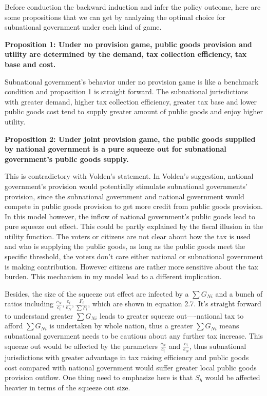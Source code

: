 \begin{itemize}
Before conduction the backward induction and infer the policy outcome, here are some propositions that we can get by analyzing the optimal choice for subnational government under each kind of game.

\textbf{Proposition 1: Under no provision game, public goods provision and utility are determined by the demand, tax collection efficiency, tax base and cost.}

Subnational government's behavior under no provision game is like a benchmark condition and proposition 1 is straight forward. The subnational jurisdictions with greater demand, higher tax collection efficiency, greater tax base and lower public goods cost tend to supply greater amount of public goods and enjoy higher utility.

\textbf{Proposition 2: Under joint provision game, the public goods supplied by national government is a pure squeeze out for subnational government's public goods supply.}

This is contradictory with Volden's statement. In Volden's suggestion, national government's provision would potentially stimulate subnational governments' provision, since the subnational government and national government would compete in public goods provision to get more credit from public goods provision. In this model however, the inflow of national government's public goods lead to pure squeeze out effect. This could be partly explained by the fiscal illusion in the utility function. The voters or citizens are not clear about how the tax is used and who is supplying the public goods, as long as the public goods meet the specific threshold, the voters don't care either national or subnational government is making contribution. However citizens are rather more sensitive about the tax burden. This mechanism in my model lead to a different implication.

Besides, the size of the squeeze out effect are infected by a $\sum G_{Ni}$ and a bunch of ratios including $\frac{c_N}{c_i}, \frac{e_i}{e_N}, \frac{F_i}{\sum F_i}$, which are shown in equation 2.7. It's straight forward to understand greater $\sum G_{Ni}$ leads to greater squeeze out----national tax to afford $\sum G_{Ni}$ is undertaken by whole nation, thus a greater $\sum G_{Ni}$ means subnational government needs to be cautious about any further tax increase. This squeeze out would be affected by the parameters $\frac{c_N}{c_i} $ and $\frac{e_i}{e_N}$, thus subnational jurisdictions with greater advantage in tax raising efficiency and public goods cost compared with national government would suffer greater local public goods provision outflow. One thing need to emphasize here is that $S_h$ would be affected heavier in terms of the squeeze out size.


\end{itemize}
